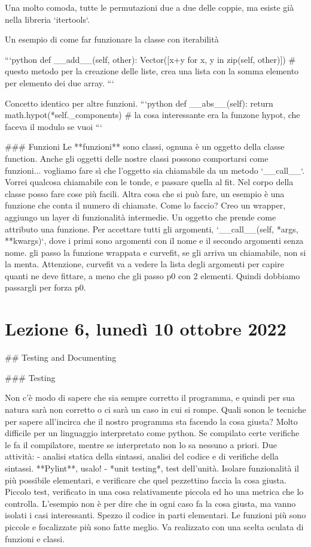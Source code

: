 \documentclass[10pt, a4paper, twosided, titlepage, draft]{book}
\begin{document}
Una molto comoda, tutte le permutazioni due a due delle coppie, ma esiste già nella libreria `itertools`.

Un esempio di come far funzionare la classe con iterabilità

```python
def __add__(self, other):
Vector([x+y for x, y in zip(self, other)])
# questo metodo per la creazione delle liste, crea una lista con la somma elemento per elemento dei due array.
```

Concetto identico per altre funzioni.
```python
def __abs__(self):
return math.hypot(*self._components)
# la cosa interessante era la funzone hypot, che faceva il modulo se vuoi
```

### Funzioni
Le **funzioni** sono classi, ognuna è un oggetto della classe function. Anche gli oggetti delle nostre classi possono comportarsi come funzioni... vogliamo fare sì che l'oggetto sia chiamabile da un metodo `__call__`. Vorrei qualcosa chiamabile con le tonde, e passare quella al fit. Nel corpo della classe posso fare cose più facili.
Altra cosa che si può fare, un esempio è una funzione che conta il numero di chiamate.
Come lo faccio? Creo un wrapper, aggiungo un layer di funzionalità intermedie.
Un oggetto che prende come attributo una funzione.
Per accettare tutti gli argomenti, `__call__(self, *args, **kwargs)`, dove i primi sono argomenti con il nome e il secondo argomenti senza nome.
gli passo la funzione wrappata e curvefit, se gli arriva un chiamabile, non si la menta.
Attenzione, curvefit va a vedere la lista degli argomenti per capire quanti ne deve fittare, a meno che gli passo p0 con 2 elementi. Quindi dobbiamo passargli per forza p0.

\section{Lezione 6, lunedì 10 ottobre 2022}

## Testing and Documenting

### Testing

Non c'è modo di sapere che sia sempre corretto il programma, e quindi per sua natura sarà non corretto o ci sarà un caso in cui si rompe.
Quali sonon le tecniche per sapere all'incirca che il nostro programma sta facendo la cosa giusta?
Molto difficile per un linguaggio interpretato come python. Se compilato certe verifiche le fa il compilatore, mentre se interpretato non lo sa nessuno a priori.
Due attività:
- analisi statica della sintassi, analisi del codice e di verifiche della sintassi. **Pylint**, usalo!
- *unit testing*, test dell'unità. Isolare funzionalità il più possibile elementari, e verificare che quel pezzettino faccia la cosa giusta. Piccolo test, verificato in una cosa relativamente piccola ed ho una metrica che lo controlla. L'esempio non è per dire che in ogni caso fa la cosa giusta, ma vanno isolati i casi interessanti. Spezzo il codice in parti elementari. Le funzioni più sono piccole e focalizzate più sono fatte meglio. Va realizzato con una scelta oculata di funzioni e classi.
\end{document}
